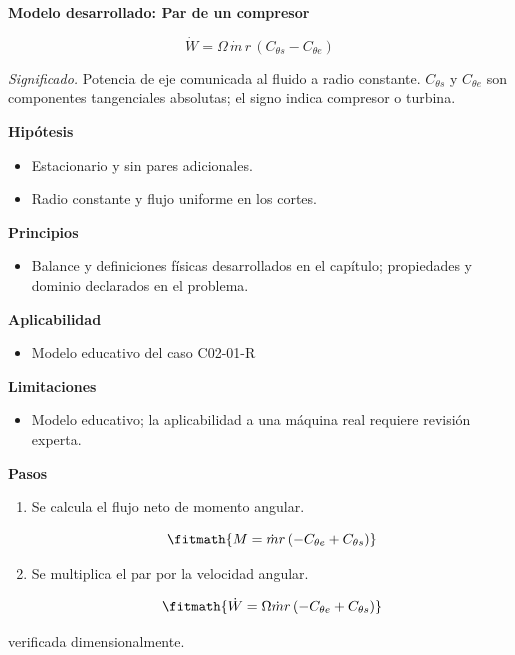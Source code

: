 \documentclass[10pt,openany]{book}
\begin{document}
\begin{tcolorbox}[title={Desarrollos del modelo}, studiumdef, breakable]

\noindent\textbf{Modelo desarrollado: Par de un compresor}

\begin{equation}
\dot W=\Omega\,\dot m\,r\,(C_{\theta s}-C_{\theta e})
\label{eq:EC-C02}
\end{equation}

\noindent\textit{Significado.} Potencia de eje comunicada al fluido a radio constante. $C_{\theta s}$ y $C_{\theta e}$ son componentes tangenciales absolutas; el signo indica compresor o turbina.

\noindent\textbf{Hipótesis}
\begin{itemize}
\item Estacionario y sin pares adicionales.
\item Radio constante y flujo uniforme en los cortes.
\end{itemize}

\noindent\textbf{Principios}
\begin{itemize}
\item Balance y definiciones físicas desarrollados en el capítulo; propiedades y dominio declarados en el problema.
\end{itemize}

\noindent\textbf{Aplicabilidad}
\begin{itemize}
\item Modelo educativo del caso C02-01-R
\end{itemize}

\noindent\textbf{Limitaciones}
\begin{itemize}
\item Modelo educativo; la aplicabilidad a una máquina real requiere revisión experta.
\end{itemize}

\noindent\textbf{Pasos}
\begin{enumerate}
\item
Se calcula el flujo neto de momento angular.

\[
\fitmath{M=\dot m r \left(- C_{\theta e} + C_{\theta s}\right)}
\]
\item
Se multiplica el par por la velocidad angular.

\[
\fitmath{\dot{W}=\Omega \dot m r \left(- C_{\theta e} + C_{\theta s}\right)}
\]
\end{enumerate}

{\noindent\footnotesize verificada dimensionalmente.\par}
\end{tcolorbox}
\end{document}
